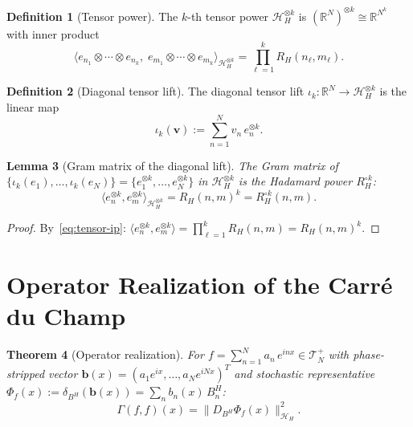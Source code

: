 \documentclass[11pt,a4paper]{article}
\theoremstyle{plain}
\newtheorem{theorem}{Theorem}[section]
\newtheorem{lemma}[theorem]{Lemma}
\theoremstyle{definition}
\newtheorem{definition}[theorem]{Definition}
\theoremstyle{remark}
\newcommand{\R}{\mathbb{R}}
\newcommand{\HH}{\mathcal{H}_H}
\begin{document}
\begin{definition}[Tensor power]\label{def:tensor}
The $k$-th tensor power $\HH^{\otimes k}$ is
$(\R^N)^{\otimes k} \cong \R^{N^k}$ with inner product
\begin{equation}\label{eq:tensor-ip}
  \langle e_{n_1} \otimes \cdots \otimes e_{n_k},\;
         e_{m_1} \otimes \cdots \otimes e_{m_k}
  \rangle_{\HH^{\otimes k}}
  = \prod_{\ell=1}^k R_H(n_\ell, m_\ell).
\end{equation}
\end{definition}

\begin{definition}[Diagonal tensor lift]\label{def:lift}
The diagonal tensor lift
$\iota_k\colon \R^N \to \HH^{\otimes k}$ is the linear map
\begin{equation}\label{eq:lift}
  \iota_k(\mathbf{v})
  := \sum_{n=1}^N v_n\,e_n^{\otimes k}.
\end{equation}
\end{definition}

\begin{lemma}[Gram matrix of the diagonal lift]
\label{lem:gram}
The Gram matrix of $\{\iota_k(e_1),\ldots,\iota_k(e_N)\}
= \{e_1^{\otimes k},\ldots,e_N^{\otimes k}\}$
in $\HH^{\otimes k}$ is the Hadamard power $R_H^{\circ k}$:
\begin{equation}\label{eq:gram}
  \langle e_n^{\otimes k}, e_m^{\otimes k}
  \rangle_{\HH^{\otimes k}}
  = R_H(n,m)^k
  = R_H^{\circ k}(n,m).
\end{equation}
\end{lemma}

\begin{proof}
By~\eqref{eq:tensor-ip}:
$\langle e_n^{\otimes k}, e_m^{\otimes k} \rangle
= \prod_{\ell=1}^k R_H(n,m) = R_H(n,m)^k$.
\end{proof}


\section{Operator Realization of the Carr\'e du Champ}
\label{sec:realization}

\begin{theorem}[Operator realization]
\label{thm:realization}
For $f = \sum_{n=1}^N a_n\,e^{inx} \in \mathcal{T}_N^+$
with phase-stripped vector
$\mathbf{b}(x) = (a_1 e^{ix}, \ldots, a_N e^{iNx})^T$
and stochastic representative
$\Phi_f(x) := \delta_{B^H}(\mathbf{b}(x))
= \sum_n b_n(x)\,B_n^H$:
\begin{equation}\label{eq:realization}
  \Gamma(f,f)(x)
  = \bigl\|D_{B^H}\Phi_f(x)\bigr\|^2_{\HH}.
\end{equation}
\end{theorem}
\end{document}
